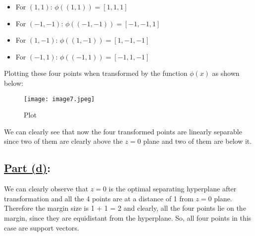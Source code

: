 \documentclass[12pt]{article}
\begin{document}
\begin{itemize}
  \item For \( (1,1) \): \( \phi((1,1)) = [1, 1, 1] \)
  \item For \( (-1,-1) \): \( \phi((-1,-1)) = [-1, -1, 1] \)
  \item For \( (1,-1) \): \( \phi((1,-1)) = [1, -1, -1] \)
  \item For \( (-1,1) \): \( \phi((-1,1)) = [-1, 1, -1] \)
\end{itemize}

Plotting these four points when transformed by the function $\phi(x)$ as shown below:
\begin{figure}[h!] %
  \centering %
  \texttt{[image: image7.jpeg]} %
  \caption{Plot} %
  \label{fig:your_label} %
\end{figure}

We can clearly see that now the four transformed points are linearly separable since two of them are clearly above the $z = 0$ plane and two of them are below it.

\subsection*{\underline{Part (d)}:}
We can clearly observe that $z = 0$ is the optimal separating hyperplane after transformation and all the 4 points are at a distance of 1 from $z = 0$ plane. Therefore the margin size is 1 + 1 = 2 and clearly, all the four points lie on the margin, since they are equidistant from the hyperplane. So, all four points in this case are support vectors.
\end{document}
